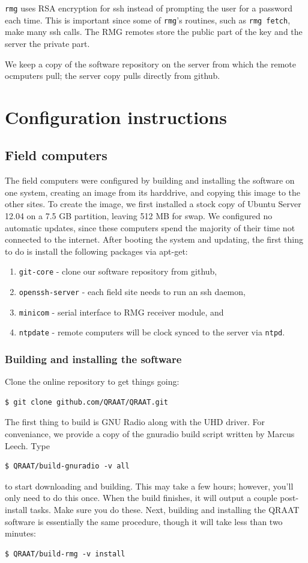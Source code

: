 \documentclass[letter]{article}
\begin{document}
\texttt{rmg} uses RSA encryption for ssh instead of prompting the user for a password each time. This is 
important since some of \texttt{rmg}'s routines, such as \texttt{rmg fetch}, make many ssh calls. The 
RMG remotes store the public part of the key and the server the private part. 

We keep a copy of the software repository on the server from which the remote ocmputers pull; the server 
copy pulls directly from github. 

\section{Configuration instructions}

\subsection{Field computers}
The field computers were configured by building and installing the software on one 
system, creating an image from its harddrive, and copying this image to the other sites. To create
the image, we first installed a stock copy of Ubuntu Server 12.04 on a 7.5 GB partition, leaving
512 MB for swap. We configured no automatic updates, since these computers spend the majority of 
their time not connected to the internet. After booting the system and updating, the first thing
to do is install the following packages via apt-get: 
\begin{enumerate}
  \item \texttt{git-core} - clone our software repository from github,
  \item \texttt{openssh-server} - each field site needs to run an ssh daemon,
  \item \texttt{minicom} - serial interface to RMG receiver module, and
  \item \texttt{ntpdate} - remote computers will be clock synced to the server via \texttt{ntpd}. 
\end{enumerate}

\subsubsection{Building and installing the software}
Clone the online repository to get things going:
\begin{verbatim}
$ git clone github.com/QRAAT/QRAAT.git
\end{verbatim}
The first thing to build is GNU Radio along with the UHD driver. For conveniance, we provide a copy 
of the gnuradio build script written by Marcus Leech. Type
\begin{verbatim}
$ QRAAT/build-gnuradio -v all
\end{verbatim}
to start downloading and building. This may take a few hours; however, you'll only need to do this once. When the 
build finishes, it will output a couple post-install tasks. Make sure you do these. Next, building
and installing the QRAAT software is essentially the same procedure, though it will take less than 
two minutes: 
\begin{verbatim}
$ QRAAT/build-rmg -v install
\end{verbatim}
\end{document}
